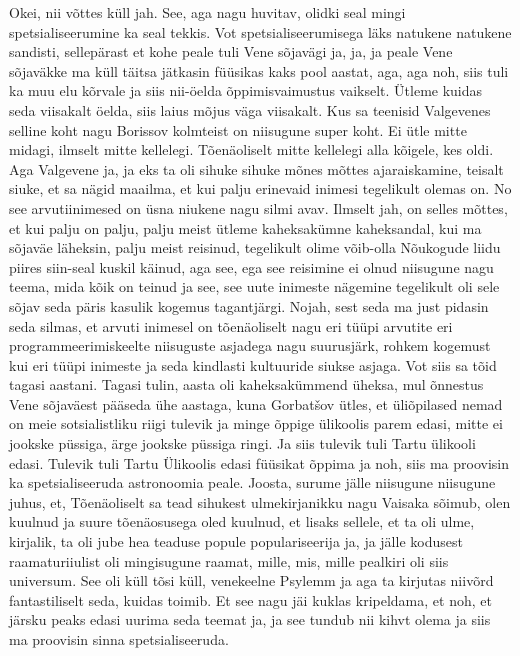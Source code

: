Okei, nii võttes küll jah. See, aga nagu huvitav, olidki seal mingi spetsialiseerumine ka seal tekkis.
Vot spetsialiseerumisega läks natukene natukene sandisti, sellepärast et kohe peale tuli Vene sõjavägi ja, ja, ja peale Vene sõjaväkke ma küll täitsa jätkasin füüsikas kaks pool aastat, aga, aga noh, siis tuli ka muu elu kõrvale ja siis nii-öelda õppimisvaimustus vaikselt. Ütleme kuidas seda viisakalt öelda, siis laius mõjus väga viisakalt. Kus sa teenisid Valgevenes selline koht nagu Borissov kolmteist on niisugune super koht.
Ei ütle mitte midagi, ilmselt mitte kellelegi.
Tõenäoliselt mitte kellelegi alla kõigele, kes oldi. Aga Valgevene ja, ja eks ta oli sihuke sihuke mõnes mõttes ajaraiskamine, teisalt siuke, et sa nägid maailma, et kui palju erinevaid inimesi tegelikult olemas on.
No see arvutiinimesed on üsna niukene nagu silmi avav.
Ilmselt jah, on selles mõttes, et kui palju on palju, palju meist ütleme kaheksakümne kaheksandal, kui ma sõjaväe läheksin, palju meist reisinud, tegelikult olime võib-olla Nõukogude liidu piires siin-seal kuskil käinud, aga see, ega see reisimine ei olnud niisugune nagu teema, mida kõik on teinud ja see, see uute inimeste nägemine tegelikult oli sele sõjav seda päris kasulik kogemus tagantjärgi.
Nojah, sest seda ma just pidasin seda silmas, et arvuti inimesel on tõenäoliselt nagu eri tüüpi arvutite eri programmeerimiskeelte niisuguste asjadega nagu suurusjärk, rohkem kogemust kui eri tüüpi inimeste ja seda kindlasti kultuuride siukse asjaga. Vot siis sa tõid tagasi aastani.
Tagasi tulin, aasta oli kaheksakümmend üheksa, mul õnnestus Vene sõjaväest pääseda ühe aastaga, kuna Gorbatšov ütles, et üliõpilased nemad on meie sotsialistliku riigi tulevik ja minge õppige ülikoolis parem edasi, mitte ei jookske püssiga, ärge jookske püssiga ringi.
Ja siis tulevik tuli Tartu ülikooli edasi.
Tulevik tuli Tartu Ülikoolis edasi füüsikat õppima ja noh, siis ma proovisin ka spetsialiseeruda astronoomia peale. Joosta, surume jälle niisugune niisugune juhus, et,
Tõenäoliselt sa tead sihukest ulmekirjanikku nagu Vaisaka sõimub, olen kuulnud ja suure tõenäosusega oled kuulnud, et lisaks sellele, et ta oli ulme, kirjalik, ta oli jube hea teaduse popule populariseerija ja, ja jälle kodusest raamaturiiulist oli mingisugune raamat, mille, mis, mille pealkiri oli siis universum. See oli küll tõsi küll, venekeelne Psylemm ja aga ta kirjutas niivõrd fantastiliselt seda, kuidas toimib. Et see nagu jäi kuklas kripeldama, et noh, et järsku peaks edasi uurima seda teemat ja, ja see tundub nii kihvt olema ja siis ma proovisin sinna spetsialiseeruda.
